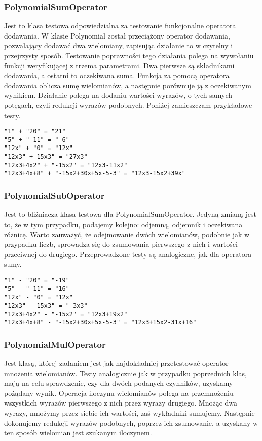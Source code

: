 \documentclass[twoside,a4paper]{book}
\begin{document}
\subsubsection{PolynomialSumOperator}

Jest to klasa testowa odpowiedzialna za testowanie funkcjonalne operatora dodawania. W klasie Polynomial został przeciążony operator dodawania, pozwalający dodawać dwa wielomiany, zapisując działanie to w czytelny i przejrzysty sposób. Testowanie poprawności tego działania polega na wywołaniu funkcji weryfikującej z trzema parametrami. Dwa pierwsze są składnikami dodawania, a ostatni to oczekiwana suma. Funkcja za pomocą operatora dodawania oblicza sumę wielomianów, a następnie porównuje ją z oczekiwanym wynikiem. Działanie polega na dodaniu wartości wyrazów, o tych samych potęgach, czyli redukcji wyrazów podobnych. Poniżej zamieszczam przykładowe testy.

\begin{lstlisting}
"1" + "20" = "21"
"5" + "-11" = "-6"
"12x" + "0" = "12x"
"12x3" + 15x3" = "27x3"
"12x3+4x2" + "-15x2" = "12x3-11x2"
"12x3+4x+8" + "-15x2+30x+5x-5-3" = "12x3-15x2+39x"
\end{lstlisting}

\subsubsection{PolynomialSubOperator}

Jest to bliźniacza klasa testowa dla PolynomialSumOperator. Jedyną zmianą jest to, że w tym przypadku, podajemy kolejno: odjemną, odjemnik i oczekiwana różnicę. Warto zauważyć, że odejmowanie dwóch wielomianów, podobnie jak w przypadku liczb, sprowadza się do zsumowania pierwszego z nich i wartości przeciwnej do drugiego. Przeprowadzone testy są analogiczne, jak dla operatora sumy.

\begin{lstlisting}
"1" - "20" = "-19"
"5" - "-11" = "16"
"12x" - "0" = "12x"
"12x3" - 15x3" = "-3x3"
"12x3+4x2" - "-15x2" = "12x3+19x2"
"12x3+4x+8" - "-15x2+30x+5x-5-3" = "12x3+15x2-31x+16"
\end{lstlisting}

\subsubsection{PolynomialMulOperator}

Jest klasą, której zadaniem jest jak najdokładniej przetestować operator mnożenia wielomianów. Testy analogicznie jak w przypadku poprzednich klas, mają na celu sprawdzenie, czy dla dwóch podanych czynników, uzyskamy pożądany wynik. Operacja iloczynu wielomianów polega na przemnożeniu wszystkich wyrazów pierwszego z nich przez wyrazy drugiego. Mnożąc dwa wyrazy, mnożymy przez siebie ich wartości, zaś wykładniki sumujemy. Następnie dokonujemy redukcji wyrazów podobnych, poprzez ich zsumowanie, a uzyskany w ten sposób wielomian jest szukanym iloczynem.
\end{document}
